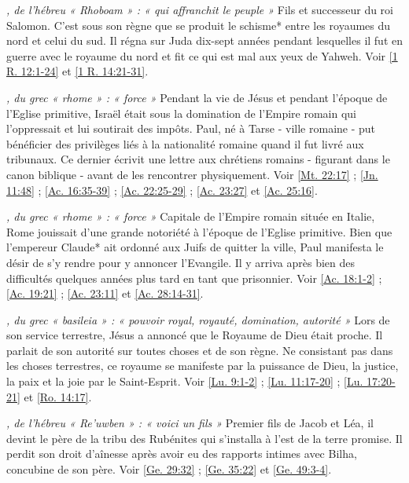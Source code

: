 \begin{multicols}{2}
\textit{, de l'hébreu « Rhoboam » : « qui affranchit le peuple »}\newline
Fils et successeur du roi Salomon. C'est sous son règne que se produit le schisme* entre les royaumes du nord et celui du sud. Il régna sur Juda dix-sept années pendant lesquelles il fut en guerre avec le royaume du nord et fit ce qui est mal aux yeux de Yahweh. Voir \vref{1 R. 12:1-24} et \vref{1 R. 14:21-31}.

\textit{, du grec « rhome » : « force »}\newline
Pendant la vie de Jésus et pendant l'époque de l'Eglise primitive, Israël était sous la domination de l'Empire romain qui l'oppressait et lui soutirait des impôts. Paul, né à Tarse - ville romaine - put bénéficier des privilèges liés à la nationalité romaine quand il fut livré aux tribunaux. Ce dernier écrivit une lettre aux chrétiens romains - figurant dans le canon biblique - avant de les rencontrer physiquement. Voir \vref{Mt. 22:17} ; \vref{Jn. 11:48} ; \vref{Ac. 16:35-39} ; \vref{Ac. 22:25-29} ; \vref{Ac. 23:27} et \vref{Ac. 25:16}.

\textit{, du grec « rhome » : « force »}\newline
Capitale de l'Empire romain située en Italie, Rome jouissait d'une grande notoriété à l'époque de l'Eglise primitive. Bien que l'empereur Claude* ait ordonné aux Juifs de quitter la ville, Paul manifesta le désir de s'y rendre pour y annoncer l'Evangile. Il y arriva après bien des difficultés quelques années plus tard en tant que prisonnier. Voir \vref{Ac. 18:1-2} ; \vref{Ac. 19:21} ; \vref{Ac. 23:11} et \vref{Ac. 28:14-31}.

\textit{, du grec « basileia » : « pouvoir royal, royauté, domination, autorité »}\newline
Lors de son service terrestre, Jésus a annoncé que le Royaume de Dieu était proche. Il parlait de son autorité sur toutes choses et de son règne. Ne consistant pas dans les choses terrestres, ce royaume se manifeste par la puissance de Dieu, la justice, la paix et la joie par le Saint-Esprit. Voir \vref{Lu. 9:1-2} ; \vref{Lu. 11:17-20} ; \vref{Lu. 17:20-21} et \vref{Ro. 14:17}.

\textit{, de l'hébreu « Re'uwben » : « voici un fils »}\newline
Premier fils de Jacob et Léa, il devint le père de la tribu des Rubénites qui s'installa à l'est de la terre promise. Il perdit son droit d'aînesse après avoir eu des rapports intimes avec Bilha, concubine de son père. Voir \vref{Ge. 29:32} ; \vref{Ge. 35:22} et \vref{Ge. 49:3-4}.


\end{multicols}
